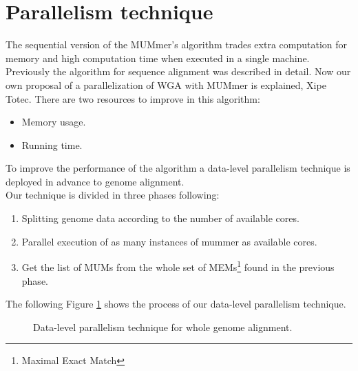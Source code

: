 \documentclass[3p,times]{elsarticle}
\begin{document}
\section{Parallelism technique}
The sequential version of the MUMmer's algorithm trades extra computation for memory and high computation time when executed in a single machine. \\
Previously the algorithm for sequence alignment was described in detail. Now our own proposal of a parallelization of WGA with MUMmer is explained, Xipe Totec. There are two resources to improve in this algorithm:
\begin{itemize}
\item Memory usage.
\item Running time.
\end{itemize}
To improve the performance of the algorithm a data-level parallelism technique is deployed in advance to genome alignment.\\
Our technique is divided in three phases following:
\begin{enumerate}
\item Splitting genome data according to the number of available cores.
\item Parallel execution of as many instances of mummer as available cores.
\item Get the list of MUMs from the whole set of MEMs\footnote{Maximal Exact Match} found in the previous phase.
\end{enumerate}
The following Figure \ref{algorithm} shows the process of our data-level parallelism technique.
\begin{figure}[htb] 
\begin{center} 
\end{center} 
\caption{Data-level parallelism technique for whole genome alignment.} 
\label{algorithm} 
\end{figure} 
\end{document}

